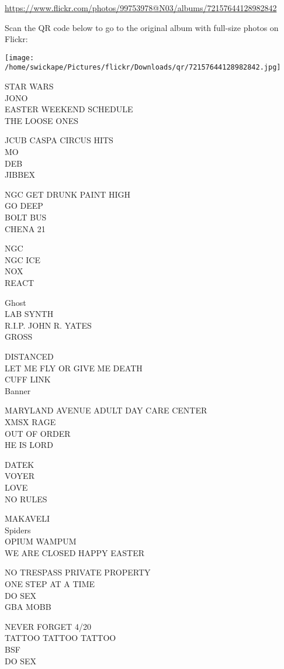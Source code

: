 \documentclass[10pt,letterpaper]{article}
\begin{document}
\url{https://www.flickr.com/photos/99753978@N03/albums/72157644128982842}

Scan the QR code below to go to the original album with full-size photos on Flickr:

\texttt{[image: /home/swickape/Pictures/flickr/Downloads/qr/72157644128982842.jpg]}


STAR WARS\\
JONO\\
EASTER WEEKEND SCHEDULE\\
THE LOOSE ONES

JCUB CASPA CIRCUS HITS\\
MO\\
DEB\\
JIBBEX

NGC GET DRUNK PAINT HIGH\\
GO DEEP\\
BOLT BUS\\
CHENA 21

NGC\\
NGC ICE\\
NOX\\
REACT

Ghost\\
LAB SYNTH\\
R.I.P. JOHN R. YATES\\
GROSS

DISTANCED\\
LET ME FLY OR GIVE ME DEATH\\
CUFF LINK\\
Banner

MARYLAND AVENUE ADULT DAY CARE CENTER\\
XMSX RAGE\\
OUT OF ORDER\\
HE IS LORD

DATEK\\
VOYER\\
LOVE\\
NO RULES

MAKAVELI\\
Spiders\\
OPIUM WAMPUM\\
WE ARE CLOSED HAPPY EASTER

NO TRESPASS PRIVATE PROPERTY\\
ONE STEP AT A TIME\\
DO SEX\\
GBA MOBB

NEVER FORGET 4/20\\
TATTOO TATTOO TATTOO\\
BSF\\
DO SEX
\end{document}

